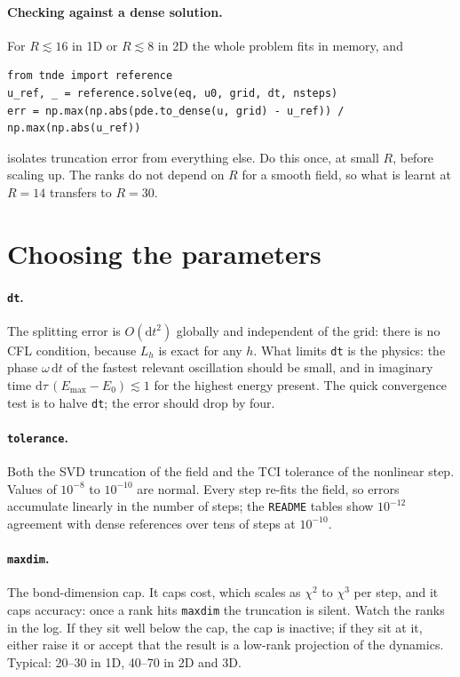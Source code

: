 \documentclass[11pt,a4paper]{article}
\newcommand{\code}[1]{\texttt{#1}}
\newcommand{\dd}{\mathrm{d}}
\begin{document}
\paragraph{Checking against a dense solution.} For $R\lesssim16$ in 1D or
$R\lesssim8$ in 2D the whole problem fits in memory, and
\begin{lstlisting}
from tnde import reference
u_ref, _ = reference.solve(eq, u0, grid, dt, nsteps)
err = np.max(np.abs(pde.to_dense(u, grid) - u_ref)) / np.max(np.abs(u_ref))
\end{lstlisting}
isolates truncation error from everything else. Do this once, at small $R$, before
scaling up. The ranks do not depend on $R$ for a smooth field, so what is learnt at
$R=14$ transfers to $R=30$.

\section{Choosing the parameters}
\label{sec:params}

\paragraph{\code{dt}.} The splitting error is $O(\dd t^2)$ globally and independent of
the grid: there is no CFL condition, because $L_h$ is exact for any $h$. What limits
\code{dt} is the physics: the phase $\omega\,\dd t$ of the fastest relevant oscillation
should be small, and in imaginary time $\dd\tau\,(E_{\max}-E_0)\lesssim1$ for the
highest energy present. The quick convergence test is to halve \code{dt}; the error
should drop by four.

\paragraph{\code{tolerance}.} Both the SVD truncation of the field and the TCI tolerance
of the nonlinear step. Values of $10^{-8}$ to $10^{-10}$ are normal. Every step re-fits
the field, so errors accumulate linearly in the number of steps; the \code{README}
tables show $10^{-12}$ agreement with dense references over tens of steps at
$10^{-10}$.

\paragraph{\code{maxdim}.} The bond-dimension cap. It caps cost, which scales as $\chi^2$
to $\chi^3$ per step, and it caps accuracy: once a rank hits \code{maxdim} the
truncation is silent. Watch the ranks in the log. If they sit well below the cap, the
cap is inactive; if they sit at it, either raise it or accept that the result is a
low-rank projection of the dynamics. Typical: 20--30 in 1D, 40--70 in 2D and 3D.
\end{document}
